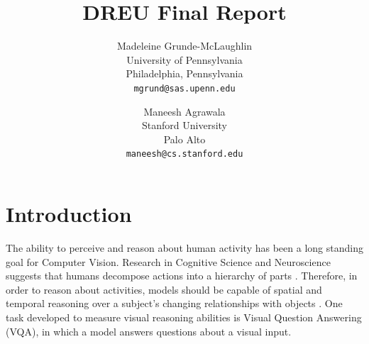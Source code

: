 \documentclass[10pt,twocolumn,letterpaper]{article}
\newcommand{\mgm}[1]{{\color{cyan}{mgm: #1}}}
\begin{document}
\title{DREU Final Report}

\author{Madeleine Grunde-McLaughlin\\
University of Pennsylvania\\
Philadelphia, Pennsylvania\\
{\tt\small mgrund@sas.upenn.edu}
\and
Maneesh Agrawala\\
Stanford University\\
Palo Alto\\
{\tt\small maneesh@cs.stanford.edu}
}

\maketitle


\section{Introduction}

\mgm{Looking into the actual lengths, a lot esp in test set are shorter than 30 seconds. may want to find average}

\mgm{High level comment: is this too much or too little detail for an intro? anything else we should include?}

\mgm{Is this a useful thing to include: Few questions in existing benchmarks focus specifically on object manipulation through videos.} 

The ability to perceive and reason about human activity has been a long standing goal for Computer Vision. Research in Cognitive Science and Neuroscience suggests that humans decompose actions into a hierarchy of parts \cite{zacks2001events}. Therefore, in order to reason about activities, models should be capable of spatial and temporal reasoning over a subject's changing relationships with objects \cite{ji2020action}. One task developed to measure visual reasoning abilities is Visual Question Answering (VQA), in which a model answers questions about a visual input. 
\end{document}
